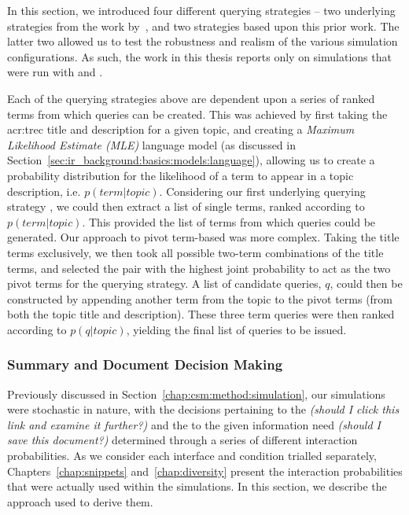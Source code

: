 In this section, we introduced four different querying strategies -- two underlying strategies from the work by~\cite{keskustalo2009querying}, and two strategies based upon this prior work. The latter two allowed us to test the robustness and realism of the various simulation configurations. As such, the work in this thesis reports only on simulations that were run with  and .


Each of the querying strategies above are dependent upon a series of ranked terms from which queries can be created. This was achieved by first taking the \gls{acr:trec} title and description for a given topic, and creating a \emph{Maximum Likelihood Estimate (MLE)} language model (as discussed in Section~\ref{sec:ir_background:basics:models:language}), allowing us to create a probability distribution for the likelihood of a term to appear in a topic description, i.e. $p(term|topic)$. Considering our first underlying querying strategy , we could then extract a list of single terms, ranked according to $p(term|topic)$. This provided the list of terms from which queries could be generated. Our approach to pivot term-based  was more complex. Taking the title terms exclusively, we then took all possible two-term combinations of the title terms, and selected the pair with the highest joint probability to act as the two pivot terms for the querying strategy. A list of candidate queries, $q$, could then be constructed by appending another term from the topic to the pivot terms (from both the topic title and description). These three term queries were then ranked according to $p(q|topic)$, yielding the final list of queries to be issued.

\subsubsection{Summary and Document Decision Making}\label{chap:csm:method:simulation:grounding:judgements}
Previously discussed in Section~\ref{chap:csm:method:simulation}, our simulations were stochastic in nature, with the decisions pertaining to the  \emph{(should I click this link and examine it further?)} and the  to the given information need \emph{(should I save this document?)} determined through a series of different interaction probabilities. As we consider each interface and condition trialled separately, Chapters~\ref{chap:snippets} and~\ref{chap:diversity} present the interaction probabilities that were actually used within the simulations. In this section, we describe the approach used to derive them.


